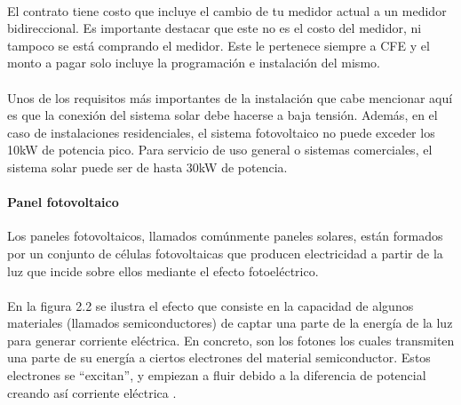 \paragraph{}
El contrato tiene costo que incluye el cambio de tu medidor actual a un medidor bidireccional. Es importante destacar que este no es el costo del medidor, ni tampoco se está comprando el medidor. Este le pertenece siempre a CFE y el monto a pagar solo incluye la programación e instalación del mismo.
\paragraph{}
Unos de los requisitos más importantes de la instalación que cabe mencionar aquí es que la conexión del sistema solar debe hacerse a baja tensión. Además, en el caso de instalaciones residenciales, el sistema fotovoltaico no puede exceder los 10kW de potencia pico. Para servicio de uso general o sistemas comerciales, el sistema solar puede ser de hasta 30kW de potencia.
\paragraph{}

\paragraph{Panel fotovoltaico}
Los paneles fotovoltaicos, llamados comúnmente paneles solares, están formados por un conjunto de células fotovoltaicas que producen electricidad a partir de la luz que incide sobre ellos mediante el efecto fotoeléctrico.
\paragraph{}
En la figura 2.2 se ilustra el efecto que consiste en la capacidad de algunos materiales (llamados semiconductores) de captar una parte de la energía de la luz para generar corriente eléctrica. En concreto, son los fotones los cuales transmiten una parte de su energía a ciertos electrones del material semiconductor. Estos electrones se “excitan”, y empiezan a fluir debido a la diferencia de potencial creando así corriente eléctrica \citep{MarcoTeorico2}.

